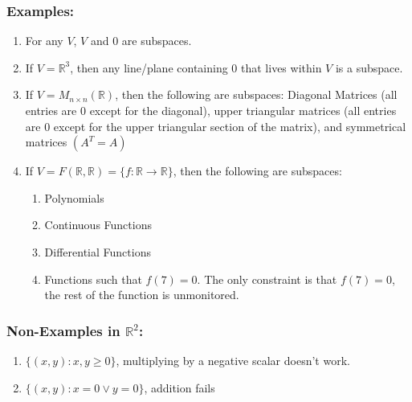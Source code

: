 \documentclass{article}
\newtheorem{one minute paper}[theorem]{One Minute Paper}
\begin{document}
\subsubsection*{Examples:}
\begin{enumerate}
    \item For any $V$, $V$ and ${0}$ are subspaces. 
    \item If $V = \mathbb{R}^3$, then any line/plane containing $0$ that lives within $V$ is a subspace.
    \item If $V = M_{n \times n}(\mathbb{R})$, then the following are subspaces: Diagonal Matrices (all entries are 0 except for the diagonal), upper triangular matrices (all entries are 0 except for the upper triangular section of the matrix), and symmetrical matrices $(A^T = A)$
    \item If $V = F(\mathbb{R}, \mathbb{R}) = \{ f: \mathbb{R} \rightarrow \mathbb{R} \}$, then the following are subspaces:
        \begin{enumerate}
            \item Polynomials 
            \item Continuous Functions
            \item Differential Functions
            \item Functions such that $f(7) = 0$. The only constraint is that $f(7) = 0$, the rest of the function is unmonitored. 
        \end{enumerate}
\end{enumerate}

\subsubsection*{Non-Examples in $\mathbb{R}^2$:}
\begin{enumerate}
    \item $\{(x,y): x,y \geq 0\}$, multiplying by a negative scalar doesn't work. 
    \item $\{(x,y): x = 0 \lor y = 0\}$, addition fails
\end{enumerate}
\end{document}
